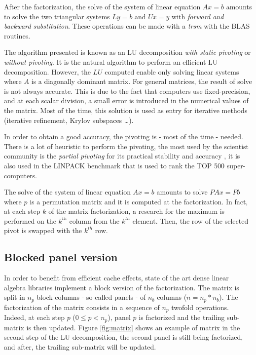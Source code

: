 After the factorization, the solve of the system of linear equation $Ax=b$ amounts to solve the two triangular systems $Ly=b$ and $Ux=y$ with \emph{forward and backward substitution}. These operations can be made with a \emph{trsm} with the BLAS routines.

The algorithm presented is known as an LU decomposition \emph{with static pivoting} or \emph{without pivoting}. It is the natural algorithm to perform an efficient LU decomposition. However, the $LU$ computed enable only solving linear systems where $A$ is a diagonally dominant matrix. For general matrices, the result of solve is not always accurate. This is due to the fact that computers use fixed-precision, and at each scalar division, a small error is introduced in the numerical values of the matrix. Most of the time, this solution is used as entry for iterative methods (iterative refinement, Krylov subspaces \dots).

In order to obtain a good accuracy, the pivoting is - most of the time - needed. There is a lot of heuristic to perform the pivoting, the most used by the scientist community is the \emph{partial pivoting} for its practical stability and accuracy \cite{Hig02}, it is also used in the LINPACK benchmark that is used to rank the TOP 500 super-computers.

The solve of the system of linear equation $Ax=b$ amounts to solve $PAx=Pb$ where $p$ is a permutation matrix and it is computed at the factorization. In fact, at each step $k$ of the matrix factorization, a research for the maximum is performed on the $k^{th}$ column from the $k^{th}$ element. Then, the row of the selected pivot is swapped with the $k^{th}$ row.

\subsection*{Blocked panel version}

In order to benefit from efficient cache effects, state of the art dense linear algebra libraries implement a block version of the factorization. The matrix is split in $n_p$ block columns - so called panels - of $n_b$ columns ($n = n_p * n_b$). The factorization of the matrix consists in a sequence of $n_p$ twofold operations. Indeed, at each step $p$ ($0 \leq p < n_p$), panel $p$ is factorized and the trailing sub-matrix is then updated. Figure \ref{fig:matrix} shows an example of matrix in the second step of the LU decomposition, the second panel is still being factorized, and after, the trailing sub-matrix will be updated.

